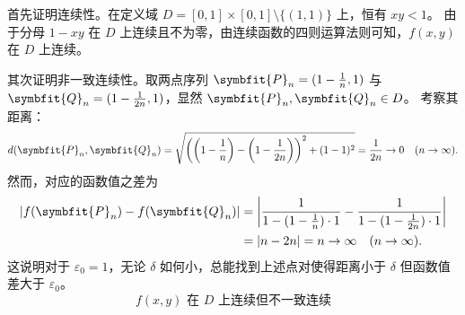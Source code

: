 \begin{myproof}
    首先证明连续性。在定义域 $D = [0,1] \times [0,1] \setminus \{(1,1)\}$ 上，恒有 $xy < 1$。
    由于分母 $1-xy$ 在 $D$ 上连续且不为零，由连续函数的四则运算法则可知，$f(x,y)$ 在 $D$ 上连续。

    其次证明非一致连续性。取两点序列 $\symbfit{P}_n = (1 - \frac{1}{n}, 1)$ 与 $\symbfit{Q}_n = (1 - \frac{1}{2n}, 1)$，显然 $\symbfit{P}_n, \symbfit{Q}_n \in D$。
    考察其距离：
    \begin{equation}
        d(\symbfit{P}_n, \symbfit{Q}_n) = \sqrt{\left( \left( 1 - \frac{1}{n} \right) - \left( 1 - \frac{1}{2n} \right) \right)^2 + (1-1)^2} = \frac{1}{2n} \to 0 \quad (n \to \infty).
    \end{equation}
    然而，对应的函数值之差为
    \begin{equation}
        \begin{aligned}
            |f(\symbfit{P}_n) - f(\symbfit{Q}_n)| & = \left| \frac{1}{1 - (1 - \frac{1}{n}) \cdot 1} - \frac{1}{1 - (1 - \frac{1}{2n}) \cdot 1} \right| \\
                                                  & = |n - 2n| = n \to \infty \quad (n \to \infty).
        \end{aligned}
    \end{equation}
    这说明对于 $\varepsilon_0 = 1$，无论 $\delta$ 如何小，总能找到上述点对使得距离小于 $\delta$ 但函数值差大于 $\varepsilon_0$。
    \begin{equation}
        \boxed{f(x,y) \text{ 在 } D \text{ 上连续但不一致连续}}
    \end{equation}
\end{myproof}

\endinput
